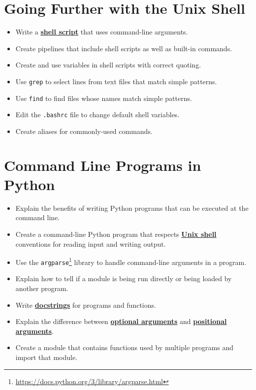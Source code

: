 \documentclass[
]{krantz}
\providecommand{\tightlist}{%
  \setlength{\itemsep}{0pt}\setlength{\parskip}{0pt}}
\renewcommand{\href}[2]{#2\footnote{\url{#1}}}
\newcommand{\gref}[2]{\hyperlink{#2}{\textbf{#1}}}
\begin{document}
\hypertarget{going-further-with-the-unix-shell}{%
\section{Going Further with the Unix Shell}\label{going-further-with-the-unix-shell}}

\begin{itemize}
\tightlist
\item
  Write a \gref{shell script}{shell\_script} that uses command-line arguments.
\item
  Create pipelines that include shell scripts as well as built-in commands.
\item
  Create and use variables in shell scripts with correct quoting.
\item
  Use \texttt{grep} to select lines from text files that match simple patterns.
\item
  Use \texttt{find} to find files whose names match simple patterns.
\item
  Edit the \texttt{.bashrc} file to change default shell variables.
\item
  Create aliases for commonly-used commands.
\end{itemize}

\hypertarget{command-line-programs-in-python}{%
\section{Command Line Programs in Python}\label{command-line-programs-in-python}}

\begin{itemize}
\tightlist
\item
  Explain the benefits of writing Python programs that can be executed at the command line.
\item
  Create a command-line Python program that respects \gref{Unix shell}{shell} conventions for reading input and writing output.
\item
  Use the \href{https://docs.python.org/3/library/argparse.html}{\texttt{argparse}} library to handle command-line arguments in a program.
\item
  Explain how to tell if a module is being run directly or being loaded by another program.
\item
  Write \gref{docstrings}{docstring} for programs and functions.
\item
  Explain the difference between \gref{optional arguments}{optional\_argument} and \gref{positional arguments}{positional\_argument}.
\item
  Create a module that contains functions used by multiple programs and import that module.
\end{itemize}
\end{document}
